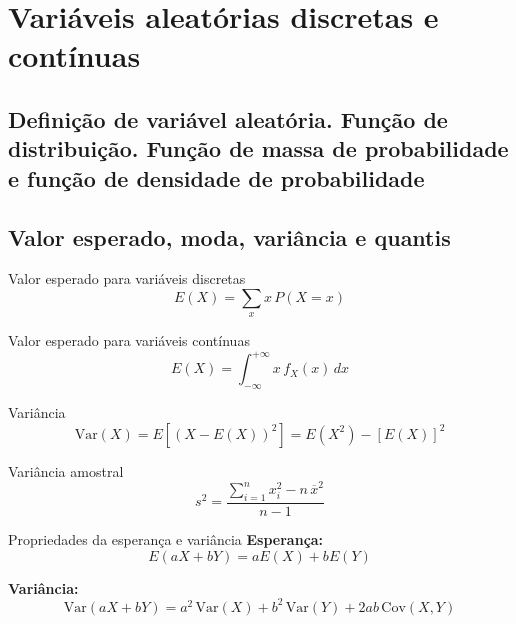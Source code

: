 \documentclass[a4paper,12pt]{article}
\begin{document}
\newpage

\section{\color{sectioncolor}Variáveis aleatórias discretas e contínuas}
\subsection{Definição de variável aleatória. Função de distribuição. Função de massa de probabilidade e função de densidade de probabilidade}

\subsection{Valor esperado, moda, variância e quantis}

\begin{formulabox}{Valor esperado para variáveis discretas}
\begin{equation}\label{formula6}\tag{Fórmula 6}
    E(X) = \sum_{x} x \, P(X = x)
\end{equation}
\end{formulabox}

\begin{formulabox}{Valor esperado para variáveis contínuas}
\begin{equation}\label{formula7}\tag{Fórmula 7}
    E(X) = \int_{-\infty}^{+\infty} x \, f_X(x) \, dx
\end{equation}
\end{formulabox}

\begin{formulabox}{Variância}
\begin{equation}\label{formula8}\tag{Fórmula 8}
    \mathrm{Var}(X) = E[(X - E(X))^2] = E(X^2) - [E(X)]^2
\end{equation}
\end{formulabox}

\begin{formulabox}{Variância amostral}
\begin{equation}\label{formula8a}\tag{Fórmula 8a}
    s^2 = \frac{\sum_{i=1}^n x_i^2 - n\,\overline{x}^2}{n-1}
\end{equation}
\end{formulabox}

\begin{formulabox}{Propriedades da esperança e variância}
\textbf{Esperança:}
\begin{equation}\label{formula9}\tag{Fórmula 9}
    E(aX + bY) = aE(X) + bE(Y)
\end{equation}

\textbf{Variância:}
\begin{equation}\label{formula10}\tag{Fórmula 10}
    \mathrm{Var}(aX + bY) = a^2 \, \mathrm{Var}(X) + b^2 \, \mathrm{Var}(Y) + 2ab\,\mathrm{Cov}(X, Y)
\end{equation}
\end{formulabox}
\end{document}
